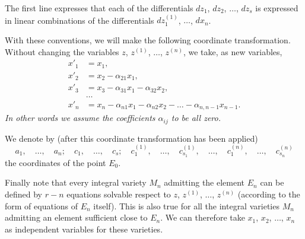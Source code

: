 \documentclass[leqno,11pt]{book}
\theoremstyle{shape1}
\theoremstyle{shapesmall}
\begin{document}
The first line expresses that each of the differentials $dz_{1}$, $dz_{2}$, $\dots$, $dz_{s}$ is expressed in linear combinations of the differentials $dz_{1}^{(1)}$, $\dots$, $dx_{n}$.

With these conventions, we will make the following coordinate transformation. Without changing the variables $z$, $z^{(1)}$, $\dots$, $z^{(n)}$, we take, as new variables,
\begin{align*}
  x'_{1}&=x_{1},\\
  x'_{2}&=x_{2}-\alpha_{21}x_{1},\\
  x'_{3}&=x_{3}-\alpha_{31}x_{1}-\alpha_{32}x_{2},\\
  &\dots\\
  x'_{n}&=x_{n}-\alpha_{n1}x_{1}-\alpha_{n2}x_{2}-\dots-\alpha_{n,n-1}x_{n-1}.
\end{align*}
\emph{In other words we assume the coefficients $\alpha_{ij}$ to be all zero.}

We denote by (after this coordinate transformation has been applied)
\[
a_{1},\quad\dots,\quad a_{n};\quad c_{1},\quad\dots,\quad c_{s};\quad c_{1}^{(1)},\quad \dots,\quad c_{s_{1}}^{(1)},\quad \dots,\quad c_{1}^{(n)},\quad \dots,\quad c_{s_{n}}^{(n)}
\]
the coordinates of the point $E_{0}$.

Finally note that every integral variety $M_{n}$ admitting the element $E_{n}$ can be defined by $r-n$ equations solvable respect to $z$, $z^{(1)}$, $\dots$, $z^{(n)}$ (according to the form of equations of $E_{n}$ itself). This is also true for all the integral varieties $M_{n}$ admitting an element sufficient close to $E_{n}$. We can therefore take $x_{1}$, $x_{2}$, $\dots$, $x_{n}$ as independent variables for these varieties.
\end{document}
